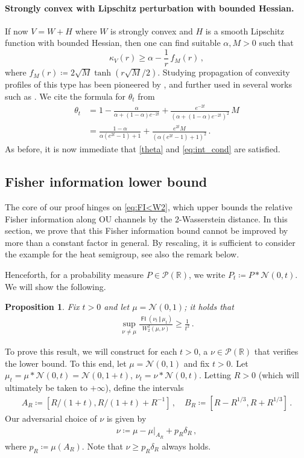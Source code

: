 \documentclass[12pt]{article}
\newcommand{\cN}{\mathcal{N}}
\newcommand{\cP}{\mathcal{P}}
\newcommand{\RR}{\mathbb{R}}
\newcommand{\R}{\RR}
\newcommand{\1}{\mathds{1}}
\newcommand*{\defeq}{\coloneqq}
\newcommand{\mmid}{\,\Vert\,}
\newcommand{\deq}{\coloneqq}
\DeclareMathOperator*{\FI}{\mathsf{FI}}
\renewcommand{\geq}{\geqslant}
\theoremstyle{plain}
\newtheorem{proposition}[theorem]{Proposition}
\theoremstyle{definition}
\theoremstyle{remark}
\begin{document}
\paragraph{Strongly convex with Lipschitz perturbation with bounded Hessian.}
If now $V = W + H$ where $W$ is strongly convex and $H$ is a smooth Lipschitz function with bounded Hessian, then one can find suitable $\alpha, M>0$ such that
$$\kappa_V(r) \geq \alpha - \frac{1}{r}\,f_M(r)\, ,$$
where $f_M(r)  \deq  2\sqrt{M} \tanh(r\sqrt{M}/2 )$.
Studying propagation of convexity profiles of this type has been pioneered by \cite{conforti2024weak}, and further used in several works such as \cite{conforti2025projected}. We cite the formula for $\theta_t$ from \citet[Lemma B.3]{silveri2025beyond}
\begin{align*}
    \theta_t &= 1 - \frac{\alpha}{\alpha+(1-\alpha)e^{-2t}} + \frac{e^{-2t}}{(\alpha+(1-\alpha)e^{-2t})^2}\,M \\
    &= \frac{1-\alpha}{\alpha(e^{2t}-1)+1} + \frac{e^{2t}M}{(\alpha(e^{2t}-1)+1)^2} \,.
\end{align*}
As before, it is now immediate that \eqref{theta} and \eqref{eq:int_cond} are satisfied.

\subsection{Fisher information lower bound}\label{sec:lower_bound}
The core of our proof hinges on \eqref{eq:FI<W2}, which upper bounds the relative Fisher information along OU channels by the $2$-Wasserstein distance. In this section, we prove that this Fisher information bound cannot be improved by more than a constant factor in general. By rescaling, it is sufficient to consider the example for the heat semigroup, see also the remark below.

Henceforth, for a probability measure $P \in \cP(\R)$, we write $P_t \defeq P * \cN(0,t)$. We will show the following.
\begin{proposition}\label{prop:fi_lb}
Fix $t > 0$ and let $\mu = \cN(0,1)$; it holds that
\begin{align*}
    \sup_{\nu \neq \mu} \frac{\FI(\nu_t\mmid \mu_t)}{W_2^2(\mu,\nu)} \geq \frac{1}{t^2}\,.
\end{align*}
\end{proposition}
To prove this result, we will construct for each $t > 0$, a $\nu \in \cP(\R)$ that verifies the lower bound. To this end, let $\mu = \cN(0,1)$ and fix $t > 0$.
Let $\mu_t = \mu * \cN(0,t) = \cN(0,1+t)$, $\nu_t = \nu * \cN(0,t)$. Letting $R > 0$ (which will ultimately be taken to $+\infty$), define the intervals
\begin{align*}
    A_R \defeq [R/(1+t), R/(1+t) + R^{-1}]\,, \quad B_R \defeq [R - R^{1/3}, R + R^{1/3}]\,.
\end{align*}
Our adversarial choice of $\nu$ is given by
\begin{align*}
    \nu \defeq \mu - \mu\big|_{A_R} + p_R \delta_R\,,
\end{align*}
where $p_R \defeq \mu(A_R)$. Note that $\nu \geq p_R \delta_R$ always holds.
\end{document}

